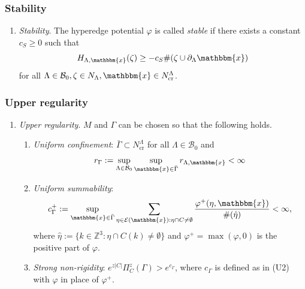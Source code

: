 \documentclass[c, 10pt]{beamer}
\newcommand{\x}{{\mathbbm{x}}}
\begin{document}
\begin{frame}\frametitle{Stability}
\begin{enumerate}[\textbf{(S)}] 
	\item \textit{Stability}. The hyperedge potential $\varphi$ is called \textit{stable} if there exists a constant $c_S \geq 0$ such that 
$$H_{\Lambda,\x}(\zeta) \geq -c_S \#(\zeta \cup \partial_\Lambda \x)$$
for all $\Lambda \in \mathcal B_0, \zeta \in N_\Lambda, \x \in N^\Lambda_{\text{cr}}$.
\end{enumerate}
\end{frame}

\begin{frame}\frametitle{Upper regularity}
\begin{enumerate}[\textbf{(U)}] 
	\item \textit{Upper regularity}. $M$ and $\Gamma$ can be chosen so that the following holds. 
		\begin{enumerate}[(U1)]
			\item \textit{Uniform confinement}: $\bar \Gamma \subset N^\Lambda_\text{cr}$ for all $\Lambda \in \mathcal B_0$ and 
			$$r_\Gamma := \sup_{\Lambda\in\mathcal B_0}\sup_{\x \in \bar\Gamma} r_{\Lambda, \x} < \infty$$
			\item \textit{Uniform summability}: 
			$$c^+_\Gamma := \sup_{\x \in \bar\Gamma}  \sum_{\eta \in \mathcal E(\x): \eta \cap C \neq \emptyset} \frac{\varphi^+(\eta,\x)}{\#(\hat\eta)} < \infty,$$
where $\hat\eta := \{k \in \mathbb Z^3: \eta \cap C(k) \neq \emptyset\}$ and $\varphi^+ = \max(\varphi,0)$ is the positive part of $\varphi$.
\item \textit{Strong non-rigidity}: $e^{z|C|} \Pi^z_C(\Gamma) > e^{c_\Gamma}$, where $c_\Gamma$ is defined as in (U2) with $\varphi$ in place of $\varphi^+$.
		\end{enumerate}
\end{enumerate}
\end{frame}
\end{document}
